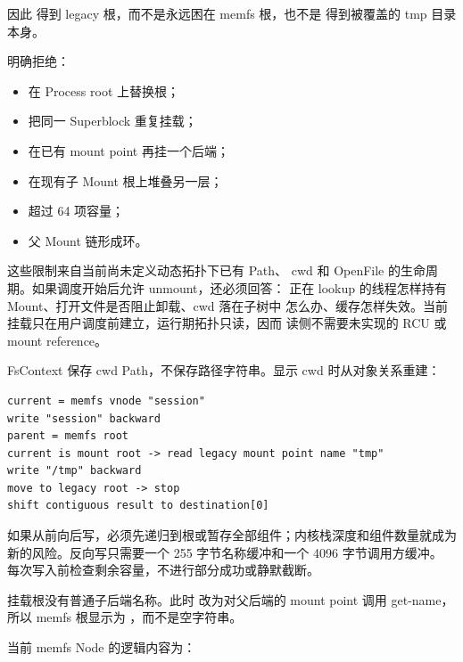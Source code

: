 因此  得到 legacy 根，而不是永远困在 memfs 根，也不是
得到被覆盖的 tmp 目录本身。

 明确拒绝：

\begin{itemize}
  \item 在 Process root 上替换根；
  \item 把同一 Superblock 重复挂载；
  \item 在已有 mount point 再挂一个后端；
  \item 在现有子 Mount 根上堆叠另一层；
  \item 超过 64 项容量；
  \item 父 Mount 链形成环。
\end{itemize}

这些限制来自当前尚未定义动态拓扑下已有 Path、
cwd 和 OpenFile 的生命周期。如果调度开始后允许 unmount，还必须回答：
正在 lookup 的线程怎样持有 Mount、打开文件是否阻止卸载、cwd 落在子树中
怎么办、缓存怎样失效。当前挂载只在用户调度前建立，运行期拓扑只读，因而
读侧不需要未实现的 RCU 或 mount reference。

FsContext 保存 cwd Path，不保存路径字符串。显示 cwd 时从对象关系重建：

\begin{lstlisting}[caption={从 /tmp/session 反向取得路径}]
current = memfs vnode "session"
write "session" backward
parent = memfs root
current is mount root -> read legacy mount point name "tmp"
write "/tmp" backward
move to legacy root -> stop
shift contiguous result to destination[0]
\end{lstlisting}

如果从前向后写，必须先递归到根或暂存全部组件；内核栈深度和组件数量就成为
新的风险。反向写只需要一个 255 字节名称缓冲和一个 4096 字节调用方缓冲。
每次写入前检查剩余容量，不进行部分成功或静默截断。

挂载根没有普通子后端名称。此时  改为对父后端的 mount
point 调用 get-name，所以 memfs 根显示为 ，而不是空字符串。


当前 memfs Node 的逻辑内容为：

